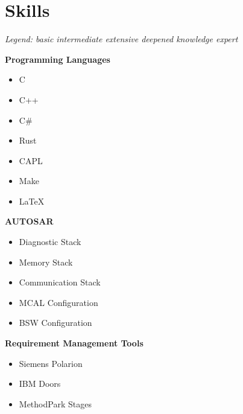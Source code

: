 \section*{Skills}

\textit{Legend:  basic \quad {} intermediate \quad {} extensive \quad {} deepened knowledge \quad {} expert}

\vspace{0.75em}

\begin{minipage}[t]{0.48\textwidth}
\textbf{Programming Languages}
\begin{itemize}[leftmargin=*,noitemsep,topsep=0pt]
    \item C 
    \item C++ 
    \item C\# 
    \item Rust 
    \item CAPL 
    \item Make 
    \item \LaTeX {}
\end{itemize}

\vspace{0.5em}

\textbf{AUTOSAR}
\begin{itemize}[leftmargin=*,noitemsep,topsep=0pt]
    \item Diagnostic Stack 
    \item Memory Stack 
    \item Communication Stack 
    \item MCAL Configuration 
    \item BSW Configuration 
\end{itemize}

\vspace{0.5em}

\textbf{Requirement Management Tools}
\begin{itemize}[leftmargin=*,noitemsep,topsep=0pt]
    \item Siemens Polarion 
    \item IBM Doors 
    \item MethodPark Stages 
\end{itemize}


\end{minipage}
